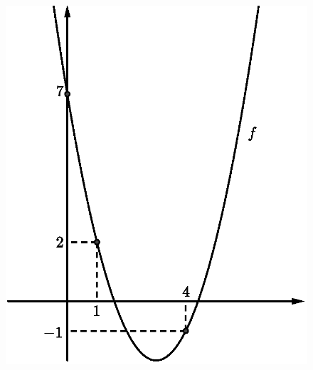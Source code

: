 \documentclass[12pt,a4paper]{article}
\begin{document}
\begin{enumerate}
  \begin{figure}[H]
   \centering
   \includegraphics[scale=0.625]{figura/grafico-funcao-polinomio-segundo-grau.eps}
  \end{figure}

\end{enumerate}
\end{document}
